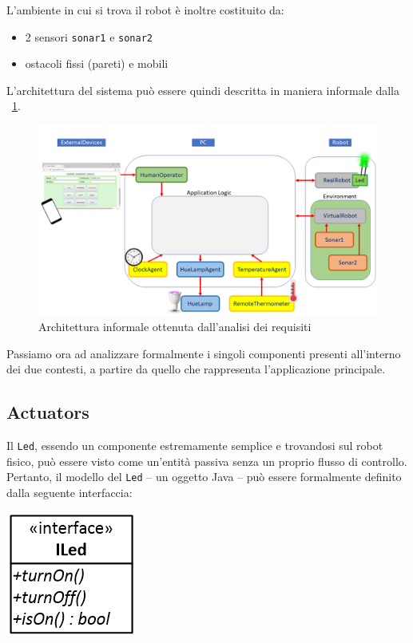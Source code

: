 \documentclass{../llncs}
\newcommand{\code}[1]{{\color{blue}\small{\texttt{#1}}}}
\newcommand{\labelssec}[1]{\label{ssec:#1}}
\newcommand{\labelfig}[1]{\label{fig:#1}}
\newcommand{\xf}[1]{\figurename~\ref{fig:#1}}
\begin{document}
\noindent L'ambiente in cui si trova il robot è inoltre costituito da:
\begin{itemize}[label={--}]
\item 2 sensori \code{sonar1} e \code{sonar2} %
\item ostacoli fissi (pareti) e mobili
\end{itemize}

L'architettura del sistema può essere quindi descritta in maniera informale dalla \xf{informalRA}.
\begin{figure}[!htb]
\centering
\includegraphics[scale=0.4]{img/informalArchitecture1.png}
\caption{Architettura informale ottenuta dall'analisi dei requisiti}\labelfig{informalRA}
\end{figure}

\vspace{8px}

Passiamo ora ad analizzare formalmente i singoli componenti presenti all'interno dei due contesti, a partire da quello che rappresenta l'applicazione principale.

\subsection{Actuators}
\labelssec{actuatorsRA}
Il \texttt{Led}, essendo un componente estremamente semplice e trovandosi sul robot fisico, può essere visto come un'entità passiva senza un proprio flusso di controllo. Pertanto, il modello del \texttt{Led} -- un oggetto Java -- può essere formalmente definito dalla seguente interfaccia:

\begin{center}
\includegraphics[scale=0.4]{img/iled.png}
\end{center}
\end{document}
